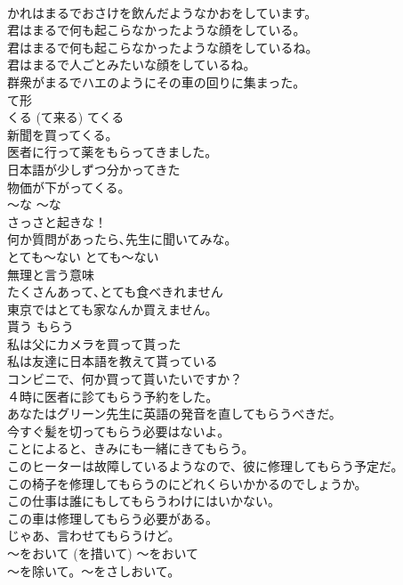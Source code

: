 \documentclass[8pt]{extreport}
\begin{document}
\begin{CJK}{UTF8}{min}
\\	かれはまるでおさけを飲んだようなかおをしています。  
\\	君はまるで何も起こらなかったような顔をしている。   
\\	君はまるで何も起こらなかったような顔をしているね。   
\\	君はまるで人ごとみたいな顔をしているね。   
\\	群衆がまるでハエのようにその車の回りに集まった。   
\\	て形
\\	くる (て来る)	てくる	
\\	新聞を買ってくる。  
\\	医者に行って薬をもらってきました。  
\\	日本語が少しずつ分かってきた  
\\	物価が下がってくる。  
\\	〜な	〜な	
\\	さっさと起きな！  
\\	何か質問があったら､先生に聞いてみな｡  
\\	とても〜ない	とても〜ない	
\\	無理と言う意味	
\\	たくさんあって､とても食べきれません   
\\	東京ではとても家なんか買えません。  
\\	貰う	もらう	
\\	私は父にカメラを買って貰った  
\\	私は友達に日本語を教えて貰っている  
\\	コンビニで、何か買って貰いたいですか？  
\\	４時に医者に診てもらう予約をした。  
\\	あなたはグリーン先生に英語の発音を直してもらうべきだ。  
\\	今すぐ髪を切ってもらう必要はないよ。  
\\	ことによると、きみにも一緒にきてもらう。  
\\	このヒーターは故障しているようなので、彼に修理してもらう予定だ。  
\\	この椅子を修理してもらうのにどれくらいかかるのでしょうか。  
\\	この仕事は誰にもしてもらうわけにはいかない。  
\\	この車は修理してもらう必要がある。  
\\	じゃあ、言わせてもらうけど。  
\\	〜をおいて (を措いて)	〜をおいて	
\\	〜を除いて。〜をさしおいて。	

\end{CJK}
\end{document}
